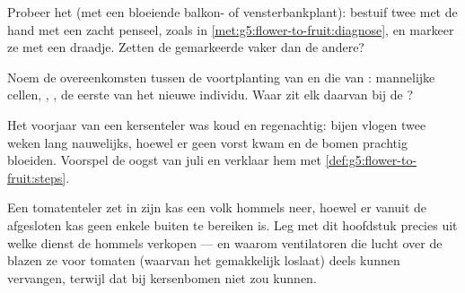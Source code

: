\begin{exercise}[$\star$]\label{exo:g5:flower-to-fruit:8}
Probeer het (met een bloeiende balkon- of vensterbankplant): bestuif
twee  met de hand met een zacht penseel, zoals in
\cref{met:g5:flower-to-fruit:diagnose}, en markeer ze met een draadje.
Zetten de gemarkeerde  vaker  dan de andere?
\end{exercise}

\begin{exercise}[$\star\star$]\label{exo:g5:flower-to-fruit:9}
Noem de overeenkomsten tussen de voortplanting van  en die van
: mannelijke cellen, , , de eerste  van het
nieuwe individu. Waar zit elk daarvan bij de ?
\end{exercise}

\begin{exercise}[$\star\star$]\label{exo:g5:flower-to-fruit:10}
Het voorjaar van een kersenteler was koud en regenachtig: bijen vlogen
twee weken lang nauwelijks, hoewel er geen vorst kwam en de bomen
prachtig bloeiden. Voorspel de oogst van juli en verklaar hem met
\cref{def:g5:flower-to-fruit:steps}.
\end{exercise}

\begin{exercise}[$\star\star\star$]\label{exo:g5:flower-to-fruit:11}
Een tomatenteler zet in zijn kas een volk hommels neer, hoewel er vanuit
de afgesloten kas geen enkele  buiten te bereiken is. Leg met dit
hoofdstuk precies uit welke dienst de hommels verkopen --- en waarom
ventilatoren die lucht over de  blazen ze voor tomaten (waarvan
het  gemakkelijk loslaat) deels kunnen vervangen, terwijl dat
bij kersenbomen niet zou kunnen.
\end{exercise}
